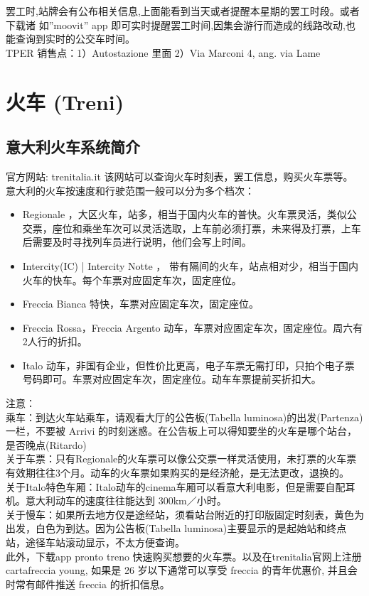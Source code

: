 罢工时,站牌会有公布相关信息,上面能看到当天或者提醒本星期的罢工时段。或者下载诸 如”moovit” app 即可实时提醒罢工时间,因集会游行而造成的线路改动,也能查询到实时的公交车时间。\\
TPER 销售点：1）Autostazione 里面 2）Via Marconi 4, ang. via Lame



\section{火车 (Treni)}

\subsection{意大利火车系统简介}

官方网站: trenitalia.it 该网站可以查询火车时刻表，罢工信息，购买火车票等。
意大利的火车按速度和行驶范围一般可以分为多个档次：
\begin{itemize}
\item  Regionale ，大区火车，站多，相当于国内火车的普快。火车票灵活，类似公交票，座位和乘坐车次可以灵活选取，上车前必须打票，未来得及打票，上车后需要及时寻找列车员进行说明，他们会写上时间。
\item  Intercity(IC) | Intercity Notte ， 带有隔间的火车，站点相对少，相当于国内火车的快车。每个车票对应固定车次，固定座位。
\item  Freccia Bianca 特快，车票对应固定车次，固定座位。
\item  Freccia Rossa，Freccia Argento 动车，车票对应固定车次，固定座位。周六有2人行的折扣。
\item  Italo 动车，非国有企业，但性价比更高，电子车票无需打印，只拍个电子票号码即可。车票对应固定车次，固定座位。动车车票提前买折扣大。
\end{itemize}
注意：\\
乘车：到达火车站乘车，请观看大厅的公告板(Tabella luminosa)的出发(Partenza)一栏，不要被 Arrivi 的时刻迷惑。在公告板上可以得知要坐的火车是哪个站台，是否晚点(Ritardo) \\
关于车票：只有Regionale的火车票可以像公交票一样灵活使用，未打票的火车票有效期往往3个月。动车的火车票如果购买的是经济舱，是无法更改，退换的。\\
关于Italo特色车厢：Italo动车的cinema车厢可以看意大利电影，但是需要自配耳机。意大利动车的速度往往能达到 300km／小时。\\
关于慢车：如果所去地方仅是途经站，须看站台附近的打印版固定时刻表，黄色为出发，白色为到达。因为公告板(Tabella luminosa)主要显示的是起始站和终点站，途径车站滚动显示，不太方便查询。\\
此外，下载app pronto treno 快速购买想要的火车票。以及在trenitalia官网上注册cartafreccia
young, 如果是 26 岁以下通常可以享受 freccia 的青年优惠价, 并且会时常有邮件推送 freccia 的折扣信息。

